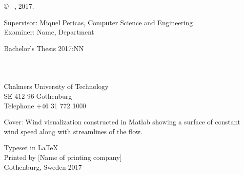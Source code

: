 \newpage
\thispagestyle{plain}
\vspace*{4.5cm}
\varHeadline \\
\varSubtitle \\
\varNames \setlength{\parskip}{1cm}

\copyright ~ \varNames, 2017. \setlength{\parskip}{1cm}

Supervisor: Miquel Pericas, Computer Science and Engineering\\
Examiner: Name, Department \setlength{\parskip}{1cm}

Bachelor's Thesis 2017:NN\\	%
\varDepartment \\
\varDivision \\
\varResearchGroupName\\
Chalmers University of Technology\\
SE-412 96 Gothenburg\\
Telephone +46 31 772 1000 \setlength{\parskip}{0.5cm}

\vfill
Cover: Wind visualization constructed in Matlab showing a surface of constant wind speed along with streamlines of the flow. \setlength{\parskip}{0.5cm}

Typeset in \LaTeX \\
Printed by [Name of printing company]\\
Gothenburg, Sweden 2017

